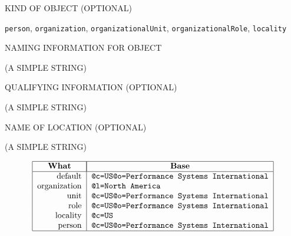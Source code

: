 

\begin{bwslide}

\begin{nrtc}
\item	KIND OF OBJECT (OPTIONAL)
    \begin{nrtc}
    \item	\verb"person", \verb"organization", \verb"organizationalUnit",
		\verb"organizationalRole", \verb"locality"
    \end{nrtc}

\item	NAMING INFORMATION FOR OBJECT
    \begin{nrtc}
    \item	(A SIMPLE STRING)
    \end{nrtc}

\item	QUALIFYING INFORMATION (OPTIONAL)
    \begin{nrtc}
    \item	(A SIMPLE STRING)
    \end{nrtc}

\item	NAME OF LOCATION (OPTIONAL)
    \begin{nrtc}
    \item	(A SIMPLE STRING)
    \end{nrtc}
\end{nrtc}
\end{bwslide}


\begin{bwslide}

\[\begin{tabular}{|r|l|}
\hline
\multicolumn{1}{|c|}{\bf What}&
		\multicolumn{1}{|c|}{\bf Base}\\
\hline
default&	\tt @c=US@o=Performance Systems International\\
organization&	\tt @l=North America\\
unit&		\tt @c=US@o=Performance Systems International\\
role&		\tt @c=US@o=Performance Systems International\\
locality&	\tt @c=US\\
person&		\tt @c=US@o=Performance Systems International\\
\hline
\end{tabular}\]
\end{bwslide}


